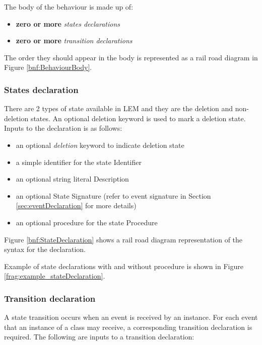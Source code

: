

The body of the behaviour is made up of:
\begin{itemize}
\item \textbf{zero or more} \textit{states declarations}
\item \textbf{zero or more} \textit{transition declarations}
\end{itemize}

The order they should appear in the body is represented as a rail road diagram in Figure \ref{bnf:BehaviourBody}.


\subsubsection{States declaration}
There are 2 types of state available in LEM and they are the deletion and non-deletion states. An optional deletion keyword is used to mark a deletion state. Inputs to the declaration is as follows:

\begin{itemize}
\item an optional \textit{deletion} keyword to indicate deletion state
\item a simple identifier for the state Identifier
\item an optional string literal Description
\item an optional State Signature (refer to event signature in Section \ref{sec:eventDeclaration} for more details)
\item an optional procedure for the state Procedure
\end{itemize}

Figure \ref{bnf:StateDeclaration} shows a rail road diagram representation of the syntax for the declaration.


Example of state declarations with and without procedure is shown in Figure \ref{frag:example_stateDeclaration}.


\subsubsection{Transition declaration}
A state transition occurs when an event is received by an instance. For each event that an instance of a class may receive, a corresponding transition declaration is required. The following are inputs to a transition declaration:

